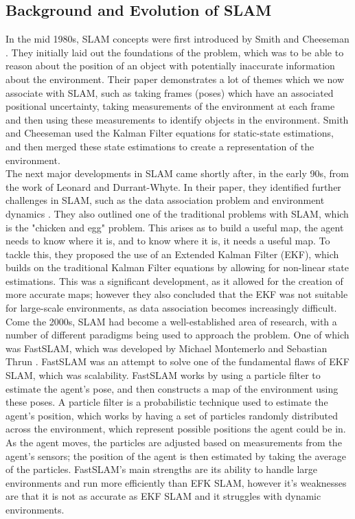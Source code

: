 \documentclass[12pt]{article}
\begin{document}
\subsection{Background and Evolution of SLAM} %
In the mid 1980s, SLAM concepts were first introduced by Smith and Cheeseman \cite{Early_SLAM}.
They initially laid out the foundations of the problem, which was to be able to reason about the position of an object with potentially
inaccurate information about the environment.
Their paper demonstrates a lot of themes which we now associate with SLAM, such as taking frames (poses) which have an
associated positional uncertainty, taking measurements of the environment at each frame and then using these measurements
to identify objects in the environment.
Smith and Cheeseman used the Kalman Filter equations for static-state estimations, and then merged these state estimations
to create a representation of the environment.\\
The next major developments in SLAM came shortly after, in the early 90s, from the work of Leonard and Durrant-Whyte.
In their paper, they identified further challenges in SLAM, such as the data association problem and environment dynamics \cite{First_EKF}.
They also outlined one of the traditional problems with SLAM, which is the "chicken and egg" problem.
This arises as to build a useful map, the agent needs to know where it is, and to know where it is, it needs a useful map.
To tackle this, they proposed the use of an Extended Kalman Filter (EKF), which builds on the traditional Kalman Filter equations by allowing for non-linear state estimations.
This was a significant development, as it allowed for the creation of more accurate
maps; however they also concluded that the EKF was not suitable for large-scale environments, as data association becomes
increasingly difficult.\\
Come the 2000s, SLAM had become a well-established area of research, with a number of different paradigms being used to approach the problem.
One of which was FastSLAM, which was developed by Michael Montemerlo and Sebastian Thrun \cite{FastSLAM}.
FastSLAM was an attempt to solve one of the fundamental flaws of EKF SLAM, which was scalability.
FastSLAM works by using a particle filter to estimate the agent's pose, and then constructs a map of the environment using these poses.
A particle filter is a probabilistic technique used to estimate the agent's position, which works by having a set of particles randomly distributed
across the environment, which represent possible positions the agent could be in.
As the agent moves, the particles are adjusted based on measurements from the agent's sensors; the position of the agent is then estimated by
taking the average of the particles.
FastSLAM's main strengths are its ability to handle large environments and run more efficiently than EFK SLAM, however
it's weaknesses are that it is not as accurate as EKF SLAM and it struggles with dynamic environments.\\
\end{document}
